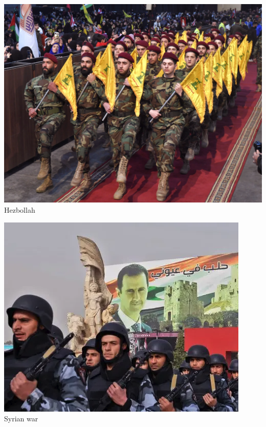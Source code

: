 \documentclass[aspectratio=43]{beamer}
\begin{document}
\begin{frame}
\begin{minipage}{0.49\textwidth}\centering
\includegraphics[width = .8\textwidth]{img/hezbollah}\\\footnotesize{Hezbollah}
\end{minipage}\hfill
\begin{minipage}{0.49\textwidth}\centering
\includegraphics[width = .8\textwidth]{img/syria}\\\footnotesize{Syrian war}
\end{minipage}
  

\end{frame}
  
\end{document}
